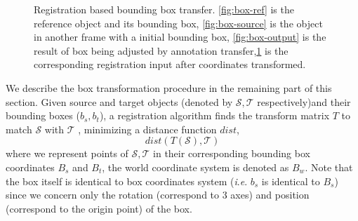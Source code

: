 \documentclass[letterpaper, 10 pt, conference]{ieeeconf}  %
\begin{document}
\begin{figure}[t]
\begin{subfigure}[t]{0.18\linewidth}
		\caption{}\label{fig:reg-input}
	\end{subfigure}\hfill

	
	\caption{Registration based bounding box transfer. \ref{fig:box-ref} is the reference object and its bounding box, \ref{fig:box-source} is the object in another frame with a initial  bounding box, \ref{fig:box-output} is the result of box being adjusted by annotation transfer,\ref{fig:reg-input} is the corresponding registration input after coordinates transformed.}
	\label {fig:annotation-transfer}
\end{figure}


We describe the box transformation procedure in the remaining part of this section. 
Given source and target objects (denoted by $\mathcal{S,T}$ respectively)and their bounding boxes ($b_s,b_t$), a registration algorithm finds the transform matrix $T$ to match $\mathcal{S}$ with $\mathcal{T}$ , minimizing a distance function $dist$,
$$dist(T(\mathcal{S}),\mathcal{T})$$
where we represent points of $\mathcal{S,T}$ in their corresponding bounding box coordinates $B_s$ and $B_t$, the world coordinate system is denoted as $B_w$. Note that the box itself is identical to box coordinates system (\textit{i}.\textit{e}. $b_s$ is identical to $B_s$) since we concern only the rotation (correspond to 3 axes) and position (correspond to the origin point) of the box.
\end{document}
